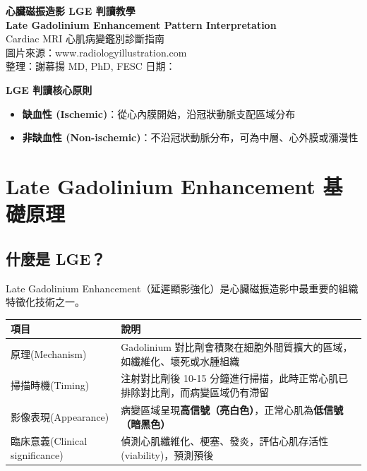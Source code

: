 \documentclass[12pt,a4paper]{article}
\begin{document}
\begin{center}
{\LARGE\bfseries\textcolor{emergency_red}{心臟磁振造影 LGE 判讀教學}}\\[0.3cm]
{\Large\textbf{Late Gadolinium Enhancement Pattern Interpretation}}\\[0.5cm]
{\large Cardiac MRI 心肌病變鑑別診斷指南}\\[0.5cm]
{\normalsize 圖片來源：www.radiologyillustration.com}\\[0.3cm]
{\normalsize 整理：謝慕揚 MD, PhD, FESC \quad 日期：\mydate}
\end{center}

\vspace{0.5cm}

\begin{importantbox}
\textbf{LGE 判讀核心原則}
\begin{itemize}[leftmargin=*]
    \item \textbf{缺血性 (Ischemic)}：從心內膜開始，沿冠狀動脈支配區域分布
    \item \textbf{非缺血性 (Non-ischemic)}：不沿冠狀動脈分布，可為中層、心外膜或瀰漫性
\end{itemize}
\end{importantbox}

\section{Late Gadolinium Enhancement 基礎原理}

\subsection{什麼是 LGE？}

Late Gadolinium Enhancement（延遲顯影強化）是心臟磁振造影中最重要的組織特徵化技術之一。

\begin{longtable}{p{4cm}p{10cm}}
\toprule
\textbf{項目} & \textbf{說明} \\
\midrule
\endfirsthead
\bottomrule
\endfoot
原理\newline (Mechanism) & Gadolinium 對比劑會積聚在細胞外間質擴大的區域，如纖維化、壞死或水腫組織 \\
\midrule
掃描時機\newline (Timing) & 注射對比劑後 10-15 分鐘進行掃描，此時正常心肌已排除對比劑，而病變區域仍有滯留 \\
\midrule
影像表現\newline (Appearance) & 病變區域呈現\textbf{高信號（亮白色）}，正常心肌為\textbf{低信號（暗黑色）} \\
\midrule
臨床意義\newline (Clinical significance) & 偵測心肌纖維化、梗塞、發炎，評估心肌存活性 (viability)，預測預後 \\
\bottomrule
\end{longtable}
\end{document}
